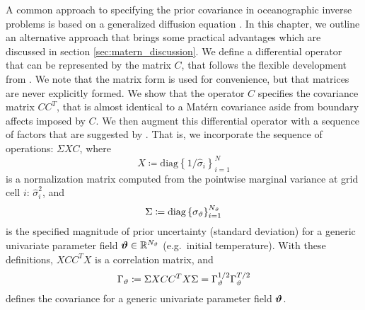 A common approach to specifying the prior covariance in oceanographic inverse
problems is based on a generalized
diffusion equation \citep{weaver_correlation_2001}.
In this chapter, we outline an alternative approach that brings some practical
advantages which are discussed in section \ref{sec:matern_discussion}.
We define a differential operator that can be represented by the matrix $C$,
that follows the flexible development from \citet{RSSB:RSSB777}.
We note that the matrix form is used for convenience, but that matrices are
never explicitly formed.
We show that the operator $C$ specifies the covariance matrix $CC^T$, that
is almost identical to a Mat\'ern covariance aside from boundary affects
imposed by $C$.
We then augment this differential operator with a sequence of factors that
are suggested by \citet{weaver_correlation_2001}.
That is, we incorporate the sequence of operations:
$\Sigma X C $, where
\begin{equation*}
    X \coloneqq \text{diag}\left\{ 1/\hat{\sigma}_{i}\right\}_{i=1}^{N}
\end{equation*}
is a
normalization matrix computed from the pointwise marginal variance at grid cell
$i$: $\hat{\sigma}^2_{i}$, and
\begin{equation*}
    \Sigma \coloneqq \text{diag}\left\{\sigma_{\vartheta}\right\}_{i=1}^{N_{\vartheta}}
\end{equation*}
is the specified magnitude of prior uncertainty (standard deviation) for a
generic univariate parameter field $\bm{\vartheta}\in\mathbb{R}^{N_{\vartheta}}$ (e.g.\ initial temperature).
With these definitions, $XCC^TX$ is a correlation matrix, and
\begin{equation}
    \Gamma_{\vartheta} \coloneqq \Sigma X C C^T X \Sigma =
    \Gamma_{\vartheta}^{1/2}\Gamma_{\vartheta}^{T/2}
\end{equation}
defines the covariance for a generic univariate parameter field $\bm{\vartheta}$.

